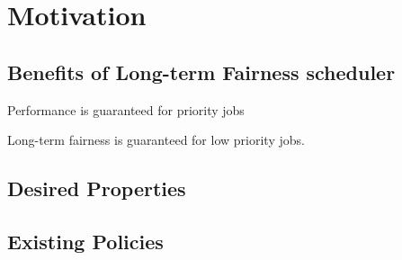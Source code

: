 \section{Motivation}

\subsection{Benefits of Long-term Fairness scheduler}

Performance is guaranteed for priority jobs

Long-term fairness is guaranteed for low priority jobs.

\subsection{Desired Properties}

\subsection{Existing Policies}